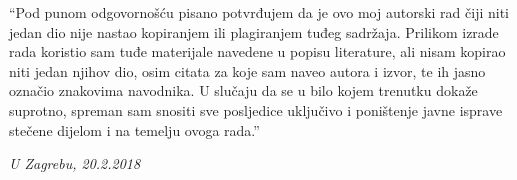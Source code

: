 {\itshape

``Pod punom odgovornošću pisano potvrđujem da je ovo moj autorski rad čiji niti jedan dio nije nastao kopiranjem ili plagiranjem tuđeg sadržaja. Prilikom izrade rada koristio sam tuđe materijale navedene u popisu literature, ali nisam kopirao niti jedan njihov dio, osim citata za koje sam naveo autora i izvor, te ih jasno označio znakovima navodnika. U slučaju da se u bilo kojem trenutku dokaže suprotno, spreman sam snositi sve posljedice uključivo i poništenje javne isprave stečene dijelom i na temelju ovoga rada.''

\begin{flushright}
\emph{U Zagrebu, 20.2.2018}
\end{flushright}

}
